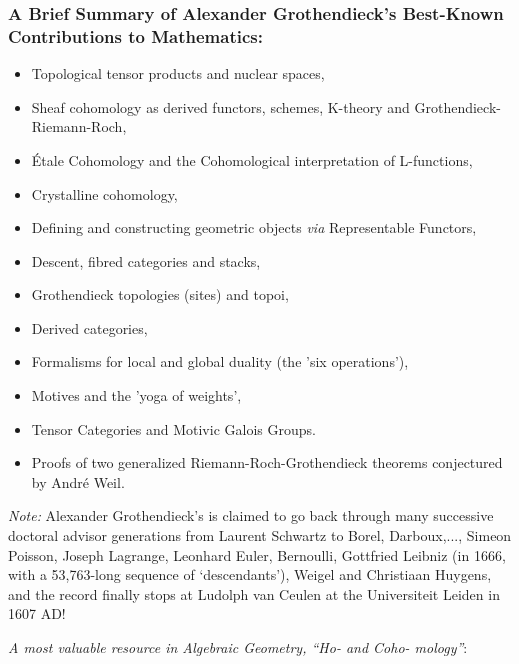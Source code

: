 \documentclass[12pt]{article}
\theoremstyle{plain}
\theoremstyle{definition}
\numberwithin{equation}{section}
\begin{document}
\subsubsection{A Brief Summary of  Alexander Grothendieck's Best-Known Contributions to Mathematics:}
\begin{itemize}
\item Topological tensor products and nuclear spaces, 
\item Sheaf cohomology as derived functors, schemes, K-theory and Grothendieck-Riemann-Roch,
\item \'Etale Cohomology and the Cohomological interpretation of L-functions,
\item Crystalline cohomology,
\item Defining and constructing geometric objects {\em via} Representable Functors, 
\item Descent, fibred categories and stacks, 
\item Grothendieck topologies (sites) and topoi, 
\item Derived categories, 
\item Formalisms for local and global duality (the 'six operations'), 
\item Motives and the 'yoga of weights', 
\item Tensor Categories and Motivic Galois Groups.
\item Proofs of two generalized Riemann-Roch-Grothendieck theorems conjectured by Andr\'e Weil.
\end{itemize}

{\em Note:}
 Alexander Grothendieck's  is claimed to go back through many successive doctoral advisor generations from Laurent Schwartz
to Borel, Darboux,..., Simeon Poisson, Joseph Lagrange, Leonhard Euler, Bernoulli, Gottfried Leibniz (in 1666, with a 53,763-long sequence of `descendants'), Weigel and Christiaan Huygens, and the record finally stops at Ludolph van Ceulen at the Universiteit Leiden in 1607 AD!


 {\em A most valuable resource in Algebraic Geometry, ``Ho- and Coho- mology''}: 
\end{document}
